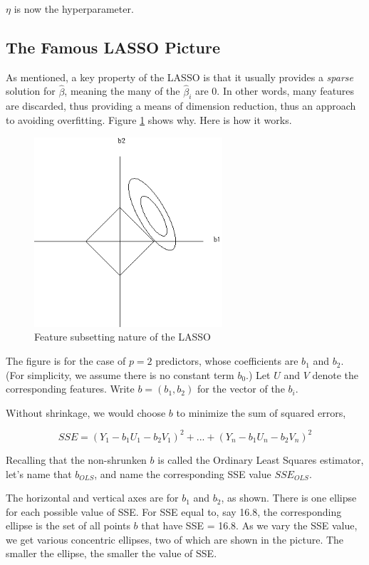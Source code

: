 $\eta$ is now the hyperparameter.

\subsection{The Famous LASSO Picture}

As mentioned, a key property of the LASSO is that it usually provides a
\textit{sparse} solution for $\widehat{\beta}$, meaning the many of the
$\widehat{\beta}_i$ are 0.  In other words, many features are discarded,
thus providing a means of dimension reduction, thus an approach to
avoiding overfitting.  Figure \ref{lassosub} shows why.  Here is how it
works.

\begin{figure}
\vskip 0.2in
\centerline{
\includegraphics[width=2.75in]{Images/LASSO_gray.png}
}
\caption{Feature subsetting nature of the LASSO}
\label{lassosub}
\end{figure}

The figure is for the case of $p = 2$ predictors, whose coefficients are
$b_1$ and $b_2$.  (For simplicity, we assume there is no constant term
$b_0$.)  Let $U$ and $V$ denote the corresponding features.
Write $b = (b_1,b_2)$ for the vector of the $b_i$.

Without shrinkage, we would choose $b$ to minimize the sum of squared
errors,

\begin{equation}
\label{sse}
SSE = (Y_1 - b_1 U_1 - b_2 V_1)^2 + ... +
(Y_n - b_1 U_n - b_2 V_n)^2
\end{equation}

Recalling that the non-shrunken $b$ is called the Ordinary Least Squares
estimator, let's name that $b_{OLS}$, and name the corresponding SSE value
$SSE_{OLS}$.

The horizontal and vertical axes are for $b_1$ and $b_2$, as shown.  There is one ellipse for each possible value of SSE.  For SSE equal to, say 16.8, the corresponding ellipse is the set of all points $b$ that have SSE = 16.8. As we vary the SSE value, we get various concentric ellipses, two of which are shown in the picture.  The smaller the ellipse, the smaller the value of SSE.

